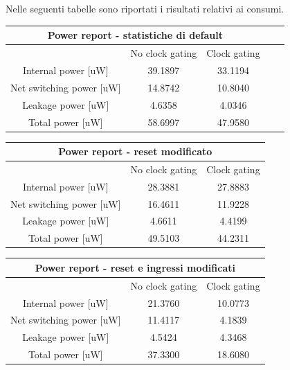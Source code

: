 \documentclass[11pt,  english, makeidx, a4paper, titlepage, oneside]{book}
\begin{document}
\\\\
Nelle seguenti tabelle sono riportati i risultati relativi ai consumi.      
\begin{center}
	\begin{tabular}{|c|c|c|c|c|}
	\hline
	\multicolumn{3}{|c|}{Power report - statistiche di default}\\
	\hline
	& No clock gating & Clock gating \\
	\hline
	Internal power [uW] & 39.1897 & 33.1194 \\
	\hline
	Net switching power [uW] & 14.8742  & 10.8040 \\
	\hline
	Leakage power [uW] & 4.6358 & 4.0346 \\
	\hline
	Total power [uW] & 58.6997 & 47.9580 \\
	\hline
	\end{tabular}	
\end{center}
\vspace{0.3cm}      
\begin{center}
	\begin{tabular}{|c|c|c|}
	\hline
	\multicolumn{3}{|c|}{Power report - reset modificato}\\
	\hline
	& No clock gating & Clock gating \\
	\hline
	Internal power [uW] & 28.3881 & 27.8883 \\
	\hline 
 	Net switching power [uW] & 16.4611 & 11.9228 \\
	\hline
	Leakage power [uW] & 4.6611 & 4.4199 \\
	\hline
	Total power [uW] & 49.5103 & 44.2311 \\
	\hline
	\end{tabular}	
\end{center}
\vspace{0.3cm}    
\begin{center}
	\begin{tabular}{|c|c|c|}
	\hline
	\multicolumn{3}{|c|}{Power report - reset e ingressi modificati}\\
	\hline
	& No clock gating & Clock gating \\
	\hline
	Internal power [uW] & 21.3760 & 10.0773 \\
	\hline 
 	Net switching power [uW] & 11.4117 & 4.1839 \\
	\hline
	Leakage power [uW] & 4.5424 & 4.3468 \\
	\hline
	Total power [uW] & 37.3300 & 18.6080 \\
	\hline
	\end{tabular}	
\end{center}
\end{document}
